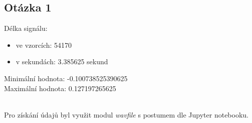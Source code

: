 \documentclass[a4paper,12pt]{article}
\begin{document}
\subsection{Otázka 1}
Délka signálu:
\begin{itemize}
	\item ve vzorcích: 54170
	\item v sekundách: 3.385625 sekund
\end{itemize}
Minimální hodnota: -0.100738525390625\\
Maximální hodnota: 0.127197265625\\
\begin{figure}[h]
\centering
{}
\end{figure}
\\
Pro získání údajů byl využit modul \emph{wavfile} s postumem dle Jupyter notebooku.
\end{document}
